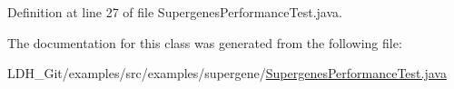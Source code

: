 Definition at line 27 of file Supergenes\-Performance\-Test.\-java.



The documentation for this class was generated from the following file\-:\begin{DoxyCompactItemize}
\item 
L\-D\-H\-\_\-\-Git/examples/src/examples/supergene/\hyperlink{_supergenes_performance_test_8java}{Supergenes\-Performance\-Test.\-java}\end{DoxyCompactItemize}
